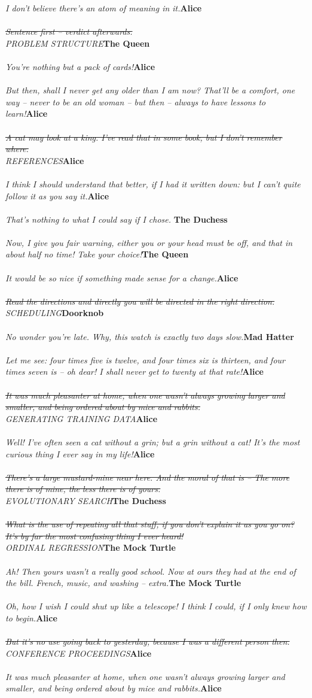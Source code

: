 \documentclass{hi-thesis}
\renewcommand{\quote}[2]{\noindent \emph{#2}\hfill{\bf #1}\\\\}
\begin{document}
\quote{Alice}{I don't believe there's an atom of meaning in it.}
\quote{The Queen}{\st{Sentence first -- verdict afterwards.}\\PROBLEM STRUCTURE}
\quote{Alice}{You're nothing but a pack of cards!}
\quote{Alice}{But then, shall I never get any older than I am now? That'll be a comfort, one way -- never to be an old woman -- but then -- always to have lessons to learn!}
\quote{Alice}{\st{A cat may look at a king. I've read that in some book, but I don't remember where.}\\REFERENCES}
\quote{Alice}{I think I should understand that better, if I had it written down: but I can't quite follow it as you say it.}
\quote{The Duchess}{That's nothing to what I could say if I chose. }
\quote{The Queen}{Now, I give you fair warning, either you or your head must be off, and that in about half no time! Take your choice!}
\quote{Alice}{It would be so nice if something made sense for a change.}
\quote{Doorknob}{\st{Read the directions and directly you will be directed in the right direction.}\\SCHEDULING}
\quote{Mad Hatter}{No wonder you're late. Why, this watch is exactly two days slow.}
\quote{Alice}{Let me see: four times five is twelve, and four times six is thirteen, and four times seven is -- oh dear! I shall never get to twenty at that rate!}
\quote{Alice}{\st{It was much pleasanter at home, when one wasn't always growing larger and smaller, and being ordered about by mice and rabbits.}\\GENERATING TRAINING DATA}
\quote{Alice}{Well! I've often seen a cat without a grin; but a grin without a cat! It's the most curious thing I ever say in my life!}
\quote{The Duchess}{\st{There's a large mustard-mine near here. And the moral of that is -- The more there is of mine, the less there is of yours.}\\EVOLUTIONARY SEARCH}
\quote{The Mock Turtle}{\st{What is the use of repeating all that stuff, if you don't explain it as you go on? It's by far the most confusing thing I ever heard!}\\ORDINAL REGRESSION}
\quote{The Mock Turtle}{Ah! Then yours wasn't a really good school. Now at ours they had at the end of the bill. French, music, and washing -- extra.}
\quote{Alice}{Oh, how I wish I could shut up like a telescope! I think I could, if I only knew how to begin.}
\quote{Alice}{\st{But it's no use going back to yesterday, because I was a different person then.}\\CONFERENCE PROCEEDINGS}
\quote{Alice}{It was much pleasanter at home, when one wasn't always growing larger and smaller, and being ordered about by mice and rabbits.}
\end{document}

